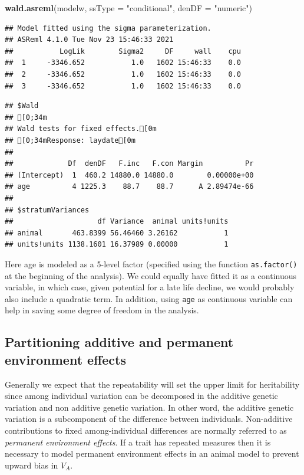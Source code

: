 \documentclass[
  12pt,
]{book}
\newenvironment{Shaded}{\begin{snugshade}}{\end{snugshade}}
\newcommand{\DataTypeTok}[1]{\textcolor[rgb]{0.13,0.29,0.53}{#1}}
\newcommand{\KeywordTok}[1]{\textcolor[rgb]{0.13,0.29,0.53}{\textbf{#1}}}
\newcommand{\NormalTok}[1]{#1}
\newcommand{\StringTok}[1]{\textcolor[rgb]{0.31,0.60,0.02}{#1}}
\begin{document}
\begin{Shaded}
\begin{Highlighting}[]
\KeywordTok{wald.asreml}\NormalTok{(modelw, }\DataTypeTok{ssType =} \StringTok{"conditional"}\NormalTok{, }\DataTypeTok{denDF =} \StringTok{"numeric"}\NormalTok{)}
\end{Highlighting}
\end{Shaded}

\begin{verbatim}
## Model fitted using the sigma parameterization.
## ASReml 4.1.0 Tue Nov 23 15:46:33 2021
##           LogLik        Sigma2     DF     wall    cpu
##  1     -3346.652           1.0   1602 15:46:33    0.0
##  2     -3346.652           1.0   1602 15:46:33    0.0
##  3     -3346.652           1.0   1602 15:46:33    0.0
\end{verbatim}

\begin{verbatim}
## $Wald
## [0;34m
## Wald tests for fixed effects.[0m
## [0;34mResponse: laydate[0m
## 
##             Df  denDF   F.inc   F.con Margin          Pr
## (Intercept)  1  460.2 14880.0 14880.0        0.00000e+00
## age          4 1225.3    88.7    88.7      A 2.89474e-66
## 
## $stratumVariances
##                    df Variance  animal units!units
## animal       463.8399 56.46460 3.26162           1
## units!units 1138.1601 16.37989 0.00000           1
\end{verbatim}

Here age is modeled as a 5-level factor (specified using the function \texttt{as.factor()} at the beginning of the analysis). We could equally have fitted it as a continuous variable, in which case, given potential for a late life decline, we would probably also include a quadratic term.
In addition, using \texttt{age} as continuous variable can help in saving some degree of freedom in the analysis.

\hypertarget{partitioning-additive-and-permanent-environment-effects}{%
\subsection{Partitioning additive and permanent environment effects}\label{partitioning-additive-and-permanent-environment-effects}}

Generally we expect that the repeatability will set the upper limit for heritability since among individual variation can be decomposed in the additive genetic variation and non additive genetic variation. In other word, the additive genetic variation is a subcomponent of the difference between individuals.
Non-additive contributions to fixed among-individual differences are normally referred to as \emph{permanent environment effects}. If a trait has repeated measures then it is necessary to model permanent environment effects in an animal model to prevent upward bias in \(V_A\).
\end{document}
